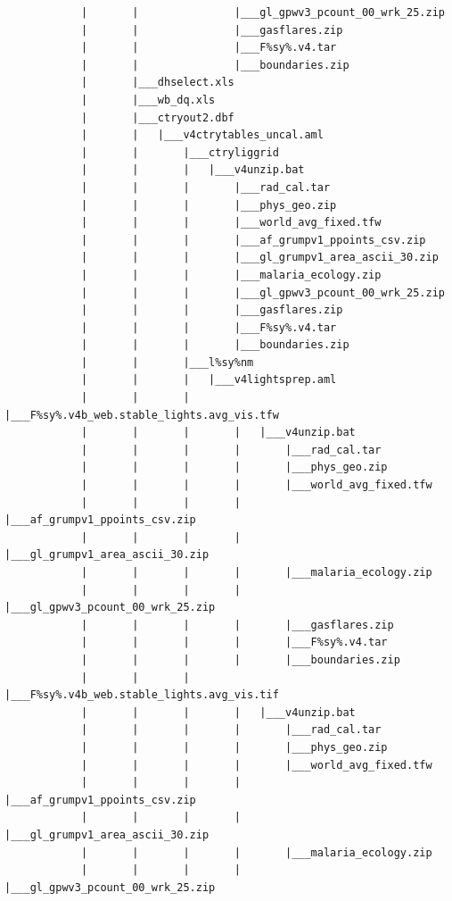 \documentclass[]{book}
\begin{document}
\begin{verbatim}
            |       |               |___gl_gpwv3_pcount_00_wrk_25.zip
            |       |               |___gasflares.zip
            |       |               |___F%sy%.v4.tar
            |       |               |___boundaries.zip
            |       |___dhselect.xls
            |       |___wb_dq.xls
            |       |___ctryout2.dbf
            |       |   |___v4ctrytables_uncal.aml
            |       |       |___ctryliggrid
            |       |       |   |___v4unzip.bat
            |       |       |       |___rad_cal.tar
            |       |       |       |___phys_geo.zip
            |       |       |       |___world_avg_fixed.tfw
            |       |       |       |___af_grumpv1_ppoints_csv.zip
            |       |       |       |___gl_grumpv1_area_ascii_30.zip
            |       |       |       |___malaria_ecology.zip
            |       |       |       |___gl_gpwv3_pcount_00_wrk_25.zip
            |       |       |       |___gasflares.zip
            |       |       |       |___F%sy%.v4.tar
            |       |       |       |___boundaries.zip
            |       |       |___l%sy%nm
            |       |       |   |___v4lightsprep.aml
            |       |       |       |___F%sy%.v4b_web.stable_lights.avg_vis.tfw
            |       |       |       |   |___v4unzip.bat
            |       |       |       |       |___rad_cal.tar
            |       |       |       |       |___phys_geo.zip
            |       |       |       |       |___world_avg_fixed.tfw
            |       |       |       |       |___af_grumpv1_ppoints_csv.zip
            |       |       |       |       |___gl_grumpv1_area_ascii_30.zip
            |       |       |       |       |___malaria_ecology.zip
            |       |       |       |       |___gl_gpwv3_pcount_00_wrk_25.zip
            |       |       |       |       |___gasflares.zip
            |       |       |       |       |___F%sy%.v4.tar
            |       |       |       |       |___boundaries.zip
            |       |       |       |___F%sy%.v4b_web.stable_lights.avg_vis.tif
            |       |       |       |   |___v4unzip.bat
            |       |       |       |       |___rad_cal.tar
            |       |       |       |       |___phys_geo.zip
            |       |       |       |       |___world_avg_fixed.tfw
            |       |       |       |       |___af_grumpv1_ppoints_csv.zip
            |       |       |       |       |___gl_grumpv1_area_ascii_30.zip
            |       |       |       |       |___malaria_ecology.zip
            |       |       |       |       |___gl_gpwv3_pcount_00_wrk_25.zip

\end{verbatim}
\end{document}
